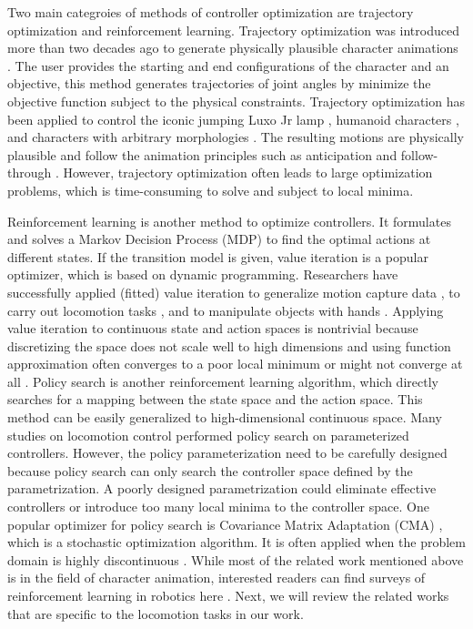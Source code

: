 Two main categroies of methods of controller optimization are trajectory optimization and reinforcement learning. Trajectory optimization was introduced more than two decades ago to generate physically plausible character animations \cite{Witkin:1988}. The user provides the starting and end configurations of the character and an objective, this method generates trajectories of joint angles by minimize the objective function subject to the physical constraints. Trajectory optimization has been applied to control the iconic jumping Luxo Jr lamp \cite{Witkin:1988}, humanoid characters \cite{Liu:2002,Jain:2009,Ye:2010}, and characters with arbitrary morphologies \cite{Wampler:2009}. The resulting motions are physically plausible and follow the animation principles such as anticipation and follow-through \cite{thomas:1995}. However, trajectory optimization often leads to large optimization problems, which is time-consuming to solve and subject to local minima.

Reinforcement learning is another method to optimize controllers. It formulates and solves a Markov Decision Process (MDP) to find the optimal actions at different states. If the transition model is given, value iteration is a popular optimizer, which is based on dynamic programming. Researchers have successfully applied (fitted) value iteration to generalize motion capture data \cite{Treuille:2007:NCA,Levine:2012:CCC}, to carry out locomotion tasks \cite{Coros:2009:RTC}, and to manipulate objects with hands \cite{Multifinger2013}. Applying value iteration to continuous state and action spaces is nontrivial because discretizing the space does not scale well to high dimensions \cite{Sutton:1998:IRL} and using function approximation often converges to a poor local minimum or might not converge at all \cite{Thrun93issuesin,Boyan95generalizationin}. Policy search \cite{Ng:2000:PPS} is another reinforcement learning algorithm, which directly searches for a mapping between the state space and the action space. This method can be easily generalized to high-dimensional continuous space. Many studies on locomotion control \cite{Yin08,Wang:2009,Coros:2011,Wang:2012,Geijtenbeek:2013} performed policy search on parameterized controllers. However, the policy parameterization need to be carefully designed because policy search can only search the controller space defined by the parametrization. A poorly designed parametrization could eliminate effective controllers or introduce too many local minima to the controller space. One popular optimizer for policy search is Covariance Matrix Adaptation (CMA) \cite{hansen2004evaluating}, which is a stochastic optimization algorithm. It is often applied when the problem domain is highly discontinuous \cite{Wu:2010:TAB,Wang:2010:OWC,Mordatch:2010:RPL}. While most of the related work mentioned above is in the field of character animation, interested readers can find surveys of reinforcement learning in robotics here \cite{Bagnell:2013}. Next, we will review the related works that are specific to the locomotion tasks in our work.

